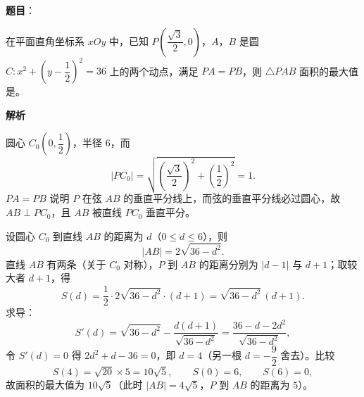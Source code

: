 \begin{answer}

\textbf{题目}：

在平面直角坐标系 $xOy$ 中，已知 $P\left(\dfrac{\sqrt3}2,0\right)$，$A$，$B$ 是圆 $C:x^2+\left(y-\dfrac12\right)^2=36$ 上的两个动点，满足 $PA=PB$，则 $\triangle PAB$ 面积的最大值是\gkblank{}。

\textbf{解析}

圆心 $C_0\left(0,\dfrac12\right)$，半径 $6$，而
\nopagebreak[4]
\[|PC_0|=\sqrt{\left(\frac{\sqrt3}2\right)^2+\left(\frac12\right)^2}=1 .\]
$PA=PB$ 说明 $P$ 在弦 $AB$ 的垂直平分线上，而弦的垂直平分线必过圆心，故 $AB\perp PC_0$，且 $AB$ 被直线 $PC_0$ 垂直平分。

设圆心 $C_0$ 到直线 $AB$ 的距离为 $d$（$0\leqslant d\leqslant6$），则
\nopagebreak[4]
\[|AB|=2\sqrt{36-d^2}.\]
直线 $AB$ 有两条（关于 $C_0$ 对称），$P$ 到 $AB$ 的距离分别为 $|d-1|$ 与 $d+1$；取较大者 $d+1$，得
\nopagebreak[4]
\[S(d)=\frac12\cdot2\sqrt{36-d^2}\cdot(d+1)=\sqrt{36-d^2}\,(d+1).\]
求导：
\nopagebreak[4]
\[S'(d)=\sqrt{36-d^2}-\frac{d(d+1)}{\sqrt{36-d^2}}=\frac{36-d-2d^2}{\sqrt{36-d^2}},\]
令 $S'(d)=0$ 得 $2d^2+d-36=0$，即 $d=4$（另一根 $d=-\dfrac92$ 舍去）。比较
\nopagebreak[4]
\[S(4)=\sqrt{20}\times5=10\sqrt5,\qquad S(0)=6,\qquad S(6)=0,\]
故面积的最大值为 $10\sqrt5$（此时 $|AB|=4\sqrt5$，$P$ 到 $AB$ 的距离为 $5$）。


\end{answer}
